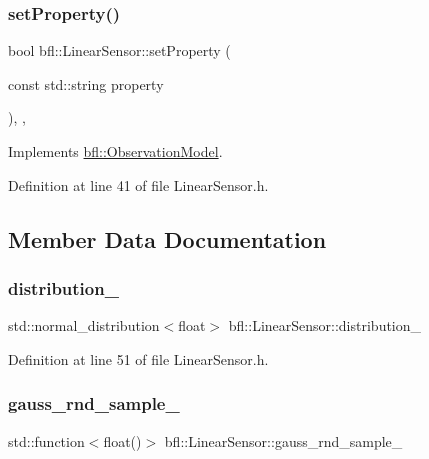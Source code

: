 \subsubsection{\texorpdfstring{set\+Property()}{setProperty()}}
{\footnotesize\ttfamily bool bfl\+::\+Linear\+Sensor\+::set\+Property (\begin{DoxyParamCaption}\item[{const std\+::string}]{property }\end{DoxyParamCaption})\hspace{0.3cm}{\ttfamily [inline]}, {\ttfamily [override]}, {\ttfamily [virtual]}}



Implements \mbox{\hyperlink{classbfl_1_1ObservationModel_a05991496674f63b6ea6c8a34da34194d}{bfl\+::\+Observation\+Model}}.



Definition at line 41 of file Linear\+Sensor.\+h.



\subsection{Member Data Documentation}
\mbox{\label{classbfl_1_1LinearSensor_a5ef72350f0591e2f95d80cf5818a5366}} 
\subsubsection{\texorpdfstring{distribution\+\_\+}{distribution\_}}
{\footnotesize\ttfamily std\+::normal\+\_\+distribution$<$float$>$ bfl\+::\+Linear\+Sensor\+::distribution\+\_\+\hspace{0.3cm}{\ttfamily [protected]}}



Definition at line 51 of file Linear\+Sensor.\+h.

\mbox{\label{classbfl_1_1LinearSensor_a9c3d6ac31fc2aeade2d47cf0c9677cb1}} 
\subsubsection{\texorpdfstring{gauss\+\_\+rnd\+\_\+sample\+\_\+}{gauss\_rnd\_sample\_}}
{\footnotesize\ttfamily std\+::function$<$float()$>$ bfl\+::\+Linear\+Sensor\+::gauss\+\_\+rnd\+\_\+sample\+\_\+\hspace{0.3cm}{\ttfamily [protected]}}



